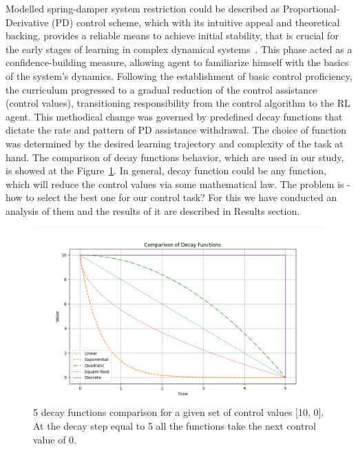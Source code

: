 Modelled spring-damper system restriction could be described as Proportional-Derivative (PD) control scheme, which with its intuitive appeal and theoretical backing, provides a reliable means to achieve initial stability, that is crucial for the early stages of learning in complex dynamical systems~\cite{franklin2010feedback}. This phase acted as a confidence-building measure, allowing agent to familiarize himself with the basics of the system’s dynamics.
Following the establishment of basic control proficiency, the curriculum progressed to a gradual reduction of the control assistance (control values), transitioning responsibility from the control algorithm to the RL agent. This methodical change was governed by predefined decay functions that dictate the rate and pattern of PD assistance withdrawal. The choice of function was determined by the desired learning trajectory and complexity of the task at hand. The comparison of decay functions behavior, which are used in our study, is showed at the Figure~\ref{fig: decay types}.
In general, decay function could be any function, which will reduce the control values via some mathematical law. The problem is - how to select the best one for our control task? For this we have conducted an analysis of them and the results of it are described in Results section. 

\begin{figure}[htb]
\centering
\includegraphics[width=15cm]{Figures/CL_decay_types_comparison.png}
\caption{5 decay functions comparison for a given set of control values [10, 0]. At the decay step equal to 5 all the functions take the next control value of 0.}
\label{fig: decay types}
\end{figure}



